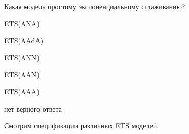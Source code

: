 
\begin{question}
Какая модель простому экспоненциальному сглаживанию?
\begin{answerlist}
  \item ETS(ANA)
  \item ETS(AAdA)
  \item ETS(ANN)
  \item ETS(AAN)
  \item ETS(AAA)
  \item нет верного ответа
\end{answerlist}
\end{question}

\begin{solution}
Смотрим спецификации различных ETS моделей.
\end{solution}

